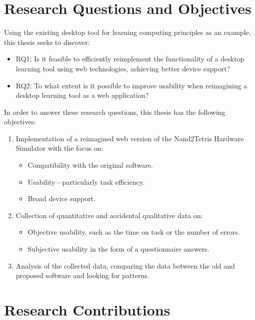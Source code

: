 \section{Research Questions and Objectives}

Using the existing desktop tool for learning computing principles as an example, this thesis seeks to discover:

\begin{itemize}
    \item RQ1: Is it feasible to efficiently reimplement the functionality of a desktop learning tool using web technologies, achieving better device support?
    \item RQ2: To what extent is it possible to improve usability when reimagining a desktop learning tool as a web application?
\end{itemize}

In order to answer these research questions, this thesis has the following objectives:

\begin{enumerate}
    \item Implementation of a reimagined web version of the Nand2Tetris Hardware Simulator with the focus on:
    \begin{itemize}
        \item Compatibility with the original software.
        \item Usability---particularly task efficiency.
        \item Broad device support.
    \end{itemize}
    \item Collection of quantitative and accidental qualitative data on:
    \begin{itemize}
        \item Objective usability, such as the time on task or the number of errors.
        \item Subjective usability in the form of a questionnaire answers.
    \end{itemize}
    \item Analysis of the collected data, comparing the data between the old and proposed software and looking for patterns.
\end{enumerate}

\section{Research Contributions}

